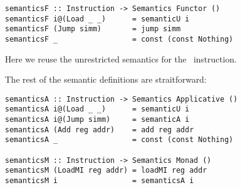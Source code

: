\begin{verbatim}
semanticsF :: Instruction -> Semantics Functor ()
semanticsF i@(Load _ _)      = semanticU i
semanticsF (Jump simm)       = jump simm
semanticsF _                 = const (const Nothing)
\end{verbatim}

Here we reuse the unrestricted semantics for the~ instruction.

The rest of the semantic definitions are straitforward:

\begin{verbatim}
semanticsA :: Instruction -> Semantics Applicative ()
semanticsA i@(Load _ _)      = semanticU i
semanticsA i@(Jump simm)     = semanticA i
semanticsA (Add reg addr)    = add reg addr
semanticsA _                 = const (const Nothing)

semanticsM :: Instruction -> Semantics Monad ()
semanticsM (LoadMI reg addr) = loadMI reg addr
semanticsM i                 = semanticsA i
\end{verbatim}







